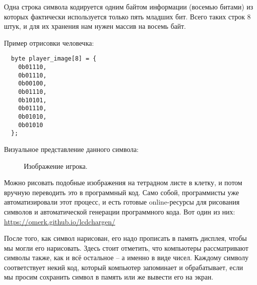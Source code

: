 \documentclass[../sparc.tex]{subfiles}
\begin{document}
Одна строка символа кодируется одним байтом информации (восемью битами) из
которых фактически используется только пять младших бит.  Всего таких строк 8
штук, и для их хранения нам нужен массив на восемь байт.

Пример отрисовки человечка:

\begin{verbatim}
  byte player_image[8] = {
    0b01110,
    0b01110,
    0b00100,
    0b01110,
    0b10101,
    0b01110,
    0b01010,
    0b01010
  };
\end{verbatim}

Визуальное представление данного символа:

\begin{figure}[ht]
  \centering
  \caption{Изображение игрока.}
  \label{fig:game-dev-char-symbol-encoding}
\end{figure}

Можно рисовать подобные изображения на тетрадном листе в клетку, и потом вручную
переводить это в программный код.  Само собой, программисты уже автоматизировали
этот процесс, и есть готовые online-ресурсы для рисования символов и
автоматической генерации программного кода.  Вот один из них:
\url{https://omerk.github.io/lcdchargen/}

После того, как символ нарисован, его надо прописать в память дисплея, чтобы мы
могли его нарисовать.  Здесь стоит отметить, что компьютеры рассматривают
символы также, как и всё остальное -- а именно в виде чисел.  Каждому символу
соответствует некий код, который компьютер запоминает и обрабатывает, если мы
просим сохранить символ в память или же вывести его на экран.

\end{document}
